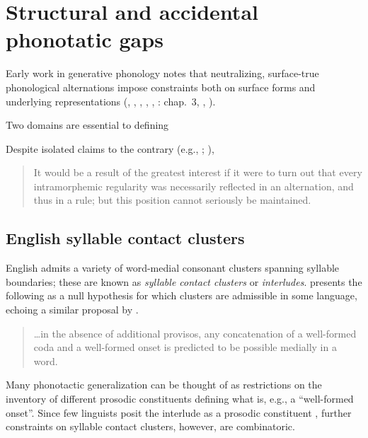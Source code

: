 \chapter{Structural and accidental phonotatic gaps}
\label{gaps}

Early work in generative phonology notes that neutralizing, surface-true phonological alternations impose constraints both on surface forms and underlying representations (\citealp[283]{Anderson1974}, \citealp[382]{SPE}, \citealp[205f.]{Dell1973}, \citealp[22f.]{SPR}, \citealp{Kisseberth1970b}, \citealp{Kenstowicz1977}: chap.~3, \citealp[28f.]{Stampe1973}, \citealp[410f.]{Stanley1967}). 

Two domains are essential to defining 

Despite isolated claims to the contrary (e.g., \citealp[297]{Hale1965}; \citealp[212f.]{Postal1968}), 

\begin{quote}
It would be a result of the greatest interest if it were to turn out that every intramorphemic regularity was necessarily reflected in an alternation, and thus in a rule; but this position cannot seriously be maintained. \citep[283]{Anderson1974}
\end{quote}

\section{English syllable contact clusters}

English admits a variety of word-medial consonant clusters spanning syllable boundaries; these are known as \emph{syllable contact clusters} or \emph{interludes}. \citeauthor{Pierrehumbert1994} presents the following as a null hypothesis for which clusters are admissible in some language, echoing a similar proposal by \citet{Haugen1956}.

\begin{quote}
\ldots{}in the absence of additional provisos, any concatenation of a well-formed coda and a well-formed onset is predicted to be possible medially in a word. \citep[][168]{Pierrehumbert1994}
\end{quote}

Many phonotactic generalization can be thought of as restrictions on the inventory of different prosodic constituents defining what is, e.g., a ``well-formed onset''. Since few linguists posit the interlude as a prosodic constituent \citep[though cf.][]{Steriade1999}, further constraints on syllable contact clusters, however, are combinatoric.

